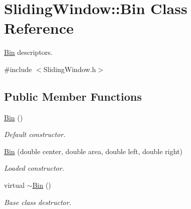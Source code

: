 \hypertarget{classSlidingWindow_1_1Bin}{}\section{Sliding\+Window\+:\+:Bin Class Reference}
\label{classSlidingWindow_1_1Bin}


\hyperlink{classSlidingWindow_1_1Bin}{Bin} descriptors.  




{\ttfamily \#include $<$Sliding\+Window.\+h$>$}

\subsection*{Public Member Functions}
\begin{DoxyCompactItemize}
\item 
\hyperlink{classSlidingWindow_1_1Bin_a0e213295f7091e2a90c4771c497bc205}{Bin} ()
\begin{DoxyCompactList}\small\item\em Default constructor. \end{DoxyCompactList}\item 
\hyperlink{classSlidingWindow_1_1Bin_a5ac8937e75aa0e4dcab05ebf0ad9b7d3}{Bin} (double center, double area, double left, double right)
\begin{DoxyCompactList}\small\item\em Loaded constructor. \end{DoxyCompactList}\item 
virtual \hyperlink{classSlidingWindow_1_1Bin_a96c2732a0aee9b69780c05defaec51e8}{$\sim$\+Bin} ()
\begin{DoxyCompactList}\small\item\em Base class destructor. \end{DoxyCompactList}\end{DoxyCompactItemize}
